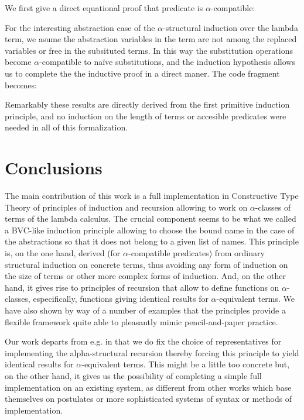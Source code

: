 \documentclass{entcs}
\newcommand{\alp}{\ensuremath{\alpha}}
\begin{document}
 \hspace{5px}

\noindent We first give a direct equational proof that  predicate is \alp-compatible:

 \hspace{5px}

\noindent For the interesting abstraction case of the \alp-structural induction over the lambda term, we asume the abstraction variables in the term are not among the replaced variables or free in the subsituted terms. In this way the substitution operations become \alp-compatible to na\"ive substitutions, and the induction hypothesis allows us to complete the the inductive proof in a direct maner. The code fragment becomes:
 
 \hspace{5px}

Remarkably these results are directly derived from the first primitive induction principle, and no induction on the length of terms or accesible predicates were needed in all of this formalization.

\section{Conclusions}
The main contribution of this work is a full implementation in Constructive Type Theory of principles of induction and recursion allowing to work on $\alpha$-classes of terms of the lambda calculus. The crucial component seems to be what we called a BVC-like induction principle allowing to choose the bound name in the case of the abstractions so that it does not belong to a given list of names. This principle is, on the one hand, derived (for $\alpha$-compatible predicates) from ordinary structural induction on concrete terms, thus avoiding any form of induction on the size of terms or other more complex forms of induction. And, on the other hand, it gives rise to principles of recursion that allow to define functions on $\alpha$-classes, especifically, functions giving identical results for $\alpha$-equivalent terms. We have also shown by way of a number of examples that the principles provide a flexible framework quite able to pleasantly mimic pencil-and-paper practice.

Our work departs from e.g. \cite{Pitts2} in that we do fix the choice of representatives for implementing the alpha-structural recursion thereby forcing this principle to yield identical results for $\alpha$-equivalent terms. This might be a little too concrete  but, on the other hand, it gives us the possibility of completing a simple full implementation on an existing system, as different from other works which base themselves on postulates or more sophisticated systems of syntax or methods of implementation.
\end{document}
